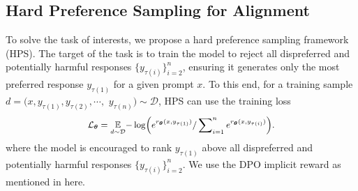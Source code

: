 %
%
\vspace{-1pt}
\subsection{Hard  Preference Sampling for   Alignment}
\vspace{0pt}
To solve the task of interests, we propose a hard  preference sampling framework (HPS). The target of the task is to train the model to reject all dispreferred and potentially harmful responses \(\{y_{\tau(i)}\}_{i=2}^n\), ensuring it generates only the most preferred response \(y_{\tau(1)}\) for a given prompt \(x\).   To this end, for a training sample $d=(x, y_{\tau{(1)}}, y_{\tau{(2)}}, \cdots, $ $y_{\tau{(n)}})\sim \mathcal{D}$, HPS can use the training loss 
\begin{equation}
	\fontsize{9}{3}\selectfont{
		\begin{aligned}
			\label{eq:PLsfdas}
			\mathcal{L}_{\wm} =\expectation_{d\sim\mathcal{D}}   \!-\log\!\Big({e^{r_{\wm} (x,y_{\tau(1)})} / \sum\nolimits_{i=1}^{n}e^{r_{\wm} (x,y_{\tau(i)})}}\Big).
	\end{aligned}}
\end{equation}
where the model is encouraged to rank \(y_{\tau(1)}\) above all dispreferred and  potentially harmful  responses $\{y_{\tau(i)}\}_{i=2}^n$. We use the DPO implicit reward as mentioned in  here.

